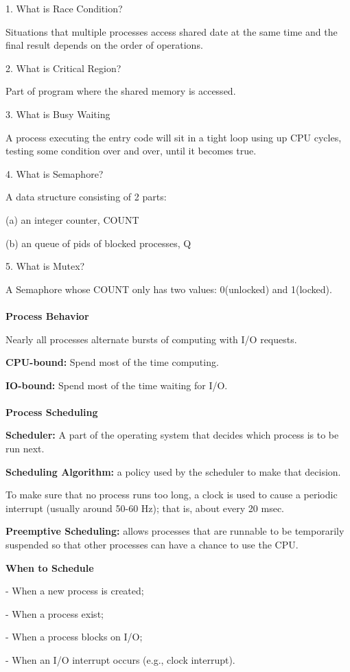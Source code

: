 \documentclass[]{report}
\begin{document}
1. What is Race Condition?

Situations that multiple processes access shared date at the same time and the final result depends on the order of operations.

2. What is Critical Region?

Part of program where the shared memory is accessed.

3. What is Busy Waiting

A process executing the entry code will sit in a tight loop using up CPU cycles, testing some condition over and over, until it becomes true.

4. What is Semaphore?

A data structure consisting of 2 parts:

(a) an integer counter, COUNT

(b) an queue of pids of blocked processes, Q

5. What is Mutex?

A Semaphore whose COUNT only has two values: 0(unlocked) and 1(locked).\\\\
\textbf{Process Behavior}

Nearly all processes alternate bursts of computing with
I/O requests.

\textbf{CPU-bound:} Spend most of the time computing.

\textbf{IO-bound:} Spend most of the time waiting for I/O.\\\\
\textbf{Process Scheduling}

\textbf{Scheduler:} A part of the operating system that decides
which process is to be run next.

\textbf{Scheduling Algorithm:} a policy used by the scheduler
to make that decision.

To make sure that no process runs too long, a clock is
used to cause a periodic interrupt (usually around 50-60
Hz); that is, about every 20 msec.

\textbf{Preemptive Scheduling:} allows processes that are
runnable to be temporarily suspended so that other
processes can have a chance to use the CPU.

\textbf{When to Schedule}

- When a new process is created;

- When a process exist;

- When a process blocks on I/O;

- When an I/O interrupt occurs (e.g., clock interrupt).
\end{document}
